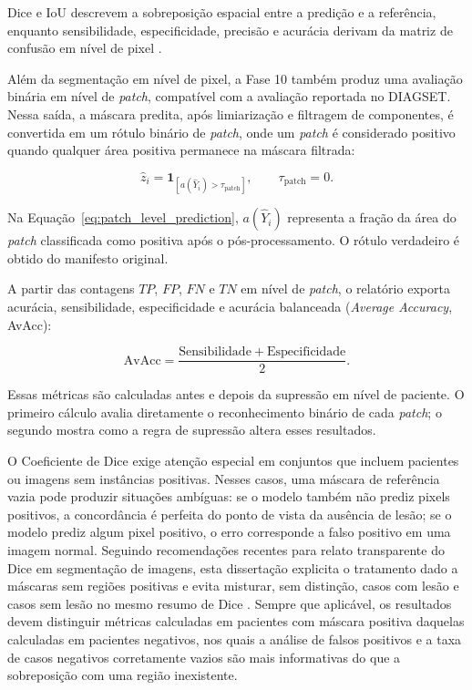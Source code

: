 Dice e IoU descrevem a sobreposição espacial entre a predição e a referência,
enquanto sensibilidade, especificidade, precisão e acurácia derivam da matriz de
confusão em nível de pixel \cite{seghier2024dice,sokolova2009performance}. 


Além da segmentação em nível de pixel, a Fase 10 também produz uma avaliação
binária em nível de \textit{patch}, compatível com a avaliação reportada no
DIAGSET. Nessa saída, a máscara predita, após limiarização e filtragem de
componentes, é convertida em um rótulo binário de \textit{patch}, onde um \textit{patch} é considerado positivo quando qualquer área positiva permanece na máscara filtrada:

\begin{equation}
    \hat{z}_i =
    \mathbf{1}_{[a(\hat{Y}_i) > \tau_{\mathrm{patch}}]},
    \qquad \tau_{\mathrm{patch}}=0.
    \label{eq:patch_level_prediction}
\end{equation}

Na Equação~\ref{eq:patch_level_prediction}, $a(\hat{Y}_i)$ representa a fração
da área do \textit{patch} classificada como positiva após o pós-processamento.
O rótulo verdadeiro é obtido do manifesto original.

A partir das contagens $TP$, $FP$, $FN$ e $TN$ em nível de \textit{patch}, o
relatório exporta acurácia, sensibilidade, especificidade e acurácia balanceada
(\textit{Average Accuracy}, AvAcc):

\begin{equation}
    \mathrm{AvAcc} =
    \frac{\mathrm{Sensibilidade}+\mathrm{Especificidade}}{2}.
    \label{eq:patch_avacc}
\end{equation}

Essas métricas são calculadas antes e depois da supressão em nível de paciente.
O primeiro cálculo avalia diretamente o reconhecimento binário de cada
\textit{patch}; o segundo mostra como a regra de supressão altera esses
resultados.

O Coeficiente de Dice exige atenção especial em conjuntos que incluem pacientes
ou imagens sem instâncias positivas. Nesses casos, uma máscara de referência
vazia pode produzir situações ambíguas: se o modelo também não prediz pixels
positivos, a concordância é perfeita do ponto de vista da ausência de lesão; se
o modelo prediz algum pixel positivo, o erro corresponde a falso positivo em uma
imagem normal. Seguindo recomendações recentes para relato transparente do Dice
em segmentação de imagens, esta dissertação explicita o tratamento dado a
máscaras sem regiões positivas e evita misturar, sem distinção, casos com lesão e
casos sem lesão no mesmo resumo de Dice \cite{seghier2024dice}. Sempre que
aplicável, os resultados devem distinguir métricas calculadas em pacientes com
máscara positiva daquelas calculadas em pacientes negativos, nos quais a análise
de falsos positivos e a taxa de casos negativos corretamente vazios são mais
informativas do que a sobreposição com uma região inexistente.

